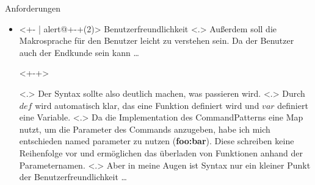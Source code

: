 \begin{frame}{Anforderungen}
\begin{itemize}
{              Ein Beispiel wäre \ldots
            }
        \begin{uncoverenv}<+->
          \tabto{4.6cm}
          \myMIn$if(has_unsaved()) \{ save(); \}$\hspace*{-4cm} %
        \end{uncoverenv}
            \note[item]<.>{
              Das ein Makro nur probiert zu speichern, wenn es etwas zum speichern gibt.
            }
            \note[item]<.>{
              Generell sollte speichern schnell gehen, allerdings kann es passieren, dass eine mehrere Gigabyte große Datei geschrieben werden muss, was dem Nutzer nicht zumuten ist.
            }
      \item<+- | alert@+-+(2)>
        Benutzerfreundlichkeit
            \note[item]<.>{
              Außerdem soll die Makrosprache für den Benutzer leicht zu verstehen sein. Da der Benutzer auch der Endkunde sein kann \ldots
            }
        \begin{uncoverenv}<+-+>
          \begin{myInvBox}[width=.9\linewidth]
            
          \end{myInvBox}
          \vspace{-10em}
        \end{uncoverenv}
            \note[item]<.>{
              Der Syntax sollte also deutlich machen, was passieren wird.
            }
            \note[item]<.>{
              Durch \myMIn$def$ wird automatisch klar, das eine Funktion definiert wird und \myMIn$var$ definiert eine Variable.
            }
            \note[item]<.>{
              Da die Implementation des CommandPatterns eine Map nutzt, um die Parameter des Commands anzugeben, habe ich mich entschieden named parameter zu nutzen (\textbf{foo:bar}). Diese schreiben keine Reihenfolge vor und ermöglichen das überladen von Funktionen anhand der Parameternamen.
            \note[item]<.>{
              Aber in meine Augen ist Syntax nur ein kleiner Punkt der Benutzerfreundlichkeit \ldots
            }
            }


\end{itemize}
\end{frame}
